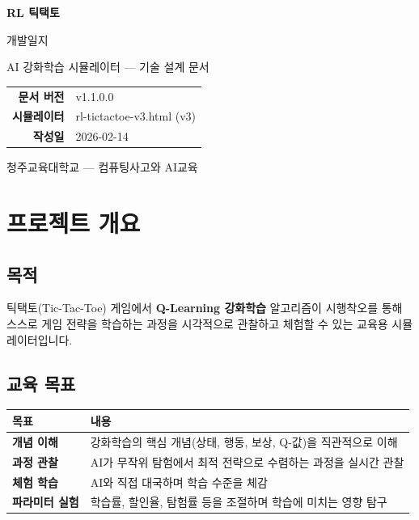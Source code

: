 \documentclass[11pt,a4paper]{article}
\begin{document}
\begin{titlepage}
\centering
\vspace*{3cm}
{\fontsize{48pt}{50pt}\selectfont {}}
\vspace{1cm}

{\Huge\bfseries\color{mainblue} RL 틱택토}
\vspace{0.3cm}

{\LARGE\color{darkbrown} 개발일지}
\vspace{1.5cm}

{\large AI 강화학습 시뮬레이터 — 기술 설계 문서}
\vspace{3cm}

\begin{tabular}{rl}
\textbf{문서 버전} & v1.1.0.0 \\
\textbf{시뮬레이터} & rl-tictactoe-v3.html (v3) \\
\textbf{작성일} & 2026-02-14 \\
\end{tabular}
\vfill
{\small\color{lightbrown} 청주교육대학교 — 컴퓨팅사고와 AI교육}
\end{titlepage}

\tableofcontents
\newpage

\section{프로젝트 개요}

\subsection{목적}

틱택토(Tic-Tac-Toe) 게임에서 \textbf{Q-Learning 강화학습} 알고리즘이 시행착오를 통해 스스로 게임 전략을 학습하는 과정을 시각적으로 관찰하고 체험할 수 있는 교육용 시뮬레이터입니다.

\subsection{교육 목표}

\begin{center}
\renewcommand{\arraystretch}{1.4}
\begin{tabular}{|>{\bfseries}l|p{9cm}|}
\hline
\rowcolor{tableheader}
\textbf{목표} & \textbf{내용} \\
\hline
개념 이해 & 강화학습의 핵심 개념(상태, 행동, 보상, Q-값)을 직관적으로 이해 \\
\hline
과정 관찰 & AI가 무작위 탐험에서 최적 전략으로 수렴하는 과정을 실시간 관찰 \\
\hline
체험 학습 & AI와 직접 대국하며 학습 수준을 체감 \\
\hline
파라미터 실험 & 학습률, 할인율, 탐험률 등을 조절하며 학습에 미치는 영향 탐구 \\
\hline
\end{tabular}
\end{center}
\end{document}
